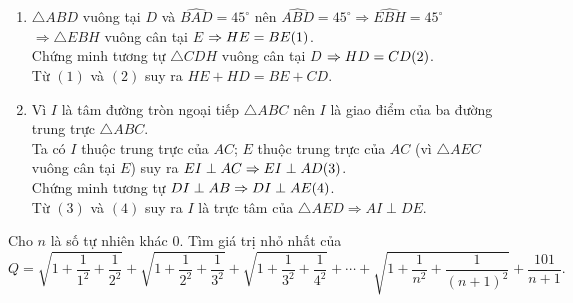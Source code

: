 \begin{ex}
{\begin{enumerate}
		$\dfrac{DE}{BC} = \dfrac{AD}{AB} = \cos \widehat{BAD} = \cos 45^\circ = \dfrac{\sqrt{2}}{2}$.
		\item $\triangle ABD$ vuông tại $D$ và $\widehat{BAD} = 45^\circ$ nên $\widehat{ABD} = 45^\circ \Rightarrow \widehat{EBH} = 45^\circ$\\
		$\Rightarrow \triangle EBH$ vuông cân tại $E$ $\Rightarrow HE=BE \hfill (1)$.\\
		Chứng minh tương tự $\triangle CDH$ vuông cân tại $D$ $\Rightarrow HD=CD \hfill (2)$.\\
		Từ $(1)$ và $(2)$ suy ra $HE+HD=BE+CD$.
		\item Vì $I$ là tâm đường tròn ngoại tiếp $\triangle ABC$ nên $I$ là giao điểm của ba đường trung trực $\triangle ABC$. \\
		Ta có $I$ thuộc trung trực của $AC$; $E$ thuộc trung trực của $AC$ (vì $\triangle AEC$ vuông cân tại $E$) suy ra $EI \perp AC \Rightarrow EI \perp AD \hfill (3)$.\\
		Chứng minh tương tự $DI \perp AB \Rightarrow DI \perp AE \hfill (4)$.\\
		Từ $(3)$ và $(4)$ suy ra $I$ là trực tâm của $\triangle AED \Rightarrow AI \perp DE$.
	\end{enumerate}
	}
\end{ex}

\begin{ex}%
	Cho $n$ là số tự nhiên khác $0$. Tìm giá trị nhỏ nhất của
	$$Q=\sqrt{1+\dfrac{1}{1^2}+\dfrac{1}{2^2}} + \sqrt{1+\dfrac{1}{2^2}+\dfrac{1}{3^2}} + \sqrt{1+\dfrac{1}{3^2}+\dfrac{1}{4^2}} + \cdots + \sqrt{1+\dfrac{1}{n^2}+\dfrac{1}{(n+1)^2}} + \dfrac{101}{n+1}.$$
\end{ex}

